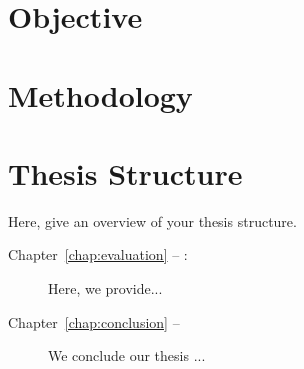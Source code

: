 \section{Objective}

\section{Methodology}

\section*{Thesis Structure}
Here, give an overview of your thesis structure.
\begin{description}
\item[Chapter~\ref{chap:evaluation} -- :] Here, we provide...
\item[Chapter~\ref{chap:conclusion} -- ] We conclude our thesis ...
\end{description}
